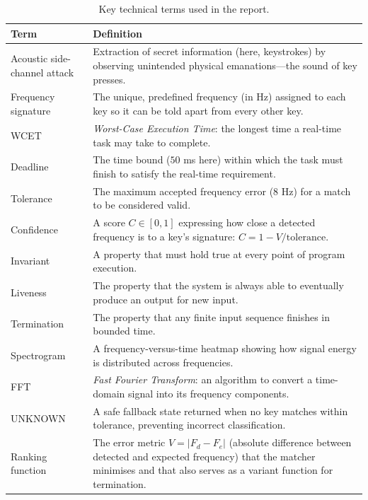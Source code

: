 \documentclass[11pt,a4paper]{article}
\begin{document}
\begin{table}[H]
    \centering
    \begin{tabular}{@{}p{4.5cm}p{11cm}@{}}
        \toprule
        \textbf{Term} & \textbf{Definition} \\
        \midrule
        Acoustic side-channel attack & Extraction of secret information (here,
            keystrokes) by observing unintended physical emanations---the sound
            of key presses. \\
        Frequency signature & The unique, predefined frequency (in Hz) assigned
            to each key so it can be told apart from every other key. \\
        WCET & \emph{Worst-Case Execution Time}: the longest time a real-time
            task may take to complete. \\
        Deadline & The time bound ($50$ ms here) within which the task must
            finish to satisfy the real-time requirement. \\
        Tolerance & The maximum accepted frequency error ($8$ Hz) for a match to
            be considered valid. \\
        Confidence & A score $C \in [0,1]$ expressing how close a detected
            frequency is to a key's signature: $C = 1 - V/\text{tolerance}$. \\
        Invariant & A property that must hold true at every point of program
            execution. \\
        Liveness & The property that the system is always able to eventually
            produce an output for new input. \\
        Termination & The property that any finite input sequence finishes in
            bounded time. \\
        Spectrogram & A frequency-versus-time heatmap showing how signal energy
            is distributed across frequencies. \\
        FFT & \emph{Fast Fourier Transform}: an algorithm to convert a
            time-domain signal into its frequency components. \\
        UNKNOWN & A safe fallback state returned when no key matches within
            tolerance, preventing incorrect classification. \\
        Ranking function & The error metric $V = |F_d - F_e|$ (absolute
            difference between detected and expected frequency) that the
            matcher minimises and that also serves as a variant function for
            termination. \\
        \bottomrule
    \end{tabular}
    \caption{Key technical terms used in the report.}
    \label{tab:glossary}
\end{table}
\end{document}

